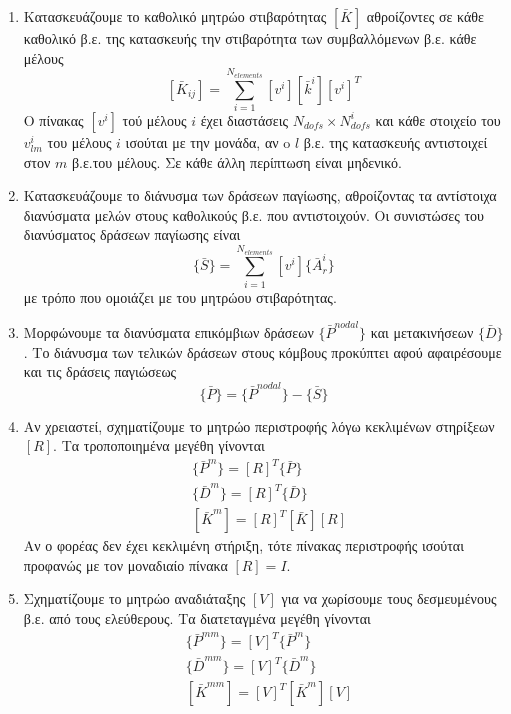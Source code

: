 \documentclass[a4paper, twocolumn]{article}
\newcommand{\num}[1]{ N_{\mathit{#1}} }
\newcommand{\vect}[1]{ \{ #1\} }
\newcommand{\mat}[1]{\left[ #1 \right]}
\newcommand{\gstiff}[1]{\mat{\bar{k}^{\mathit{#1}}}}
\newcommand{\Gstiff}[1]{\mat{\bar{K}^{\mathit{#1}}}}
\newcommand{\gforce}[1]{\vect{\bar{P}^{\mathit{#1}}}}
\newcommand{\gdisp}[1]{\vect{\bar{D}^{\mathit{#1}}}}
\newcommand{\subk}[1]{ \mat{\bar{K}_{\mathit{#1}}} }
\begin{document}
\begin{enumerate}
	\item Kατασκευάζουμε το καθολικό μητρώο στιβαρότητας $\Gstiff{}$
	 αθροίζοντες σε κάθε καθολικό β.ε. της κατασκευής την στιβαρότητα 
	 των συμβαλλόμενων β.ε. κάθε μέλους
	\begin{equation}
		\subk{ij} = \sum_{i=1}^{\num{elements}} \mat{v^i} \gstiff{i} 
		\mat{v^i}^T
	\end{equation}
	O πίνακας $\mat{v^i}$ τού μέλους $i$ έχει διαστάσεις $\num{dofs} 
	\times \num{dofs}^i$ και κάθε στοιχείο του $v^i_{\mathit{lm}}$ 
	του μέλους $i$ ισούται με την 
	μονάδα, αν o $l$ β.ε. της κατασκευής αντιστοιχεί στον $m$ β.ε.του 
	μέλους. Σε κάθε άλλη περίπτωση είναι μηδενικό.
	
	\item Κατασκευάζουμε το διάνυσμα των δράσεων παγίωσης, 
	αθροίζοντας τα αντίστοιχα διανύσματα μελών στους καθολικούς β.ε. 
	που αντιστοιχούν. Οι συνιστώσες του διανύσματος δράσεων παγίωσης 
	είναι
	\begin{equation}
		\vect{\bar S} = \sum_{i=1}^{\num{elements}} \mat{v^i} 
		\vect{\bar{A}_r^i}
	\end{equation}
	με τρόπο που ομοιάζει με του μητρώου στιβαρότητας.
	
	\item Μορφώνουμε τα διανύσματα επικόμβιων δράσεων $\vect{\bar 
	P^{\mathit{nodal}}}$ και μετακινήσεων $\vect{\bar D}$. Το 
	διάνυσμα 
	των
	τελικών δράσεων στους κόμβους προκύπτει αφού αφαιρέσουμε και τις 
	δράσεις παγιώσεως
	\begin{equation}
		\vect{\bar P} = \vect{\bar P^{\mathit{nodal}}} - \vect{\bar S}
	\end{equation}
	\item Αν χρειαστεί, σχηματίζουμε το μητρώο περιστροφής λόγω 
	κεκλιμένων στηρίξεων $\mat{R}$. Τα τροποποιημένα μεγέθη γίνονται
	\begin{align}
		&\gforce{m} = \mat{R}^T \gforce{} \\
		&\gdisp{m} = \mat{R}^T \gdisp{} \\
		&\Gstiff{m} = \mat{R}^T \Gstiff{} \mat{R}
	\end{align}
	Αν ο φορέας δεν έχει κεκλιμένη στήριξη, τότε πίνακας περιστροφής 
	ισούται προφανώς με τον μοναδιαίο πίνακα $\mat{R}=I$.
	
	\item Σχηματίζουμε το μητρώο αναδιάταξης $\mat{V}$ για να 
	χωρίσουμε τους δεσμευμένους β.ε. από τους ελεύθερους. Τα 
	διατεταγμένα μεγέθη γίνονται
	\begin{align}
		&\gforce{mm} = \mat{V}^T \gforce{m} \\
		&\gdisp{mm} = \mat{V}^T \gdisp{m} \\
		&\Gstiff{mm} = \mat{V}^T \Gstiff{m} \mat{V} 
	\end{align}
\end{enumerate}
\end{document}
